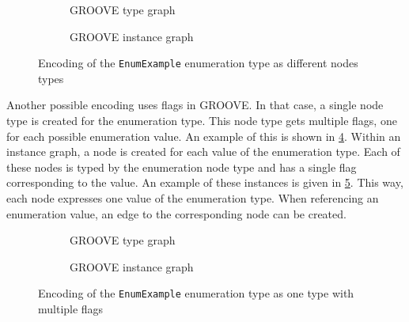 \begin{figure}
    \centering
    \begin{subfigure}{\textwidth}
        \centering
        
        \caption{GROOVE type graph}
        \label{fig:transformation_framework:enumeration_example_groove_encoding_types:type}
    \end{subfigure}
    \par\medskip
    \begin{subfigure}{\textwidth}
        \centering
        
        \caption{GROOVE instance graph}
        \label{fig:transformation_framework:enumeration_example_groove_encoding_types:instance}
    \end{subfigure}
    \caption{Encoding of the \texttt{EnumExample} enumeration type as different nodes types}
    \label{fig:transformation_framework:enumeration_example_groove_encoding_types}
\end{figure}

Another possible encoding uses flags in GROOVE. In that case, a single node type is created for the enumeration type. This node type gets multiple flags, one for each possible enumeration value. An example of this is shown in \cref{fig:ecore_encodings:enumeration_example_groove_encoding_flags:type}. Within an instance graph, a node is created for each value of the enumeration type. Each of these nodes is typed by the enumeration node type and has a single flag corresponding to the value. An example of these instances is given in \cref{fig:ecore_encodings:enumeration_example_groove_encoding_flags:instance}. This way, each node expresses one value of the enumeration type. When referencing an enumeration value, an edge to the corresponding node can be created.

\begin{figure}
    \centering
    \begin{subfigure}{\textwidth}
        \centering
        
        \caption{GROOVE type graph}
        \label{fig:ecore_encodings:enumeration_example_groove_encoding_flags:type}
    \end{subfigure}
    \par\medskip
    \begin{subfigure}{\textwidth}
        \centering
        
        \caption{GROOVE instance graph}
        \label{fig:ecore_encodings:enumeration_example_groove_encoding_flags:instance}
    \end{subfigure}
    \caption{Encoding of the \texttt{EnumExample} enumeration type as one type with multiple flags}
    \label{fig:ecore_encodings:enumeration_example_groove_encoding_flags}
\end{figure}

